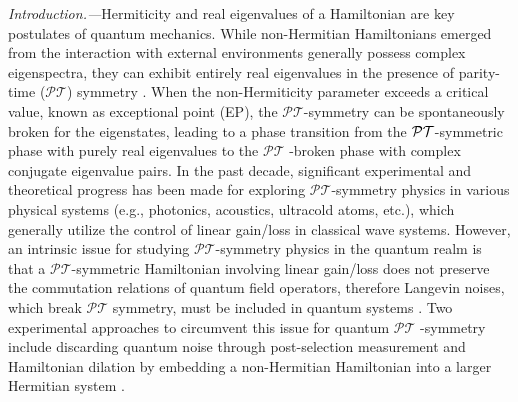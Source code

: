 \documentclass[twocolumn,prl,floatfix,citeautoscript,nofootinbib,superscriptaddress]{revtex4}
\begin{document}
\emph{{\color{blue}Introduction}.---}Hermiticity and real eigenvalues of a
Hamiltonian are key postulates of quantum mechanics. While non-Hermitian
Hamiltonians emerged from the interaction with external environments
generally possess complex eigenspectra, they can exhibit entirely real
eigenvalues in the presence of parity-time ($\mathcal{PT}$) symmetry \cite%
{PhysRevLett.80.5243,Rep.70.947,nphys4323,s41563-019-0304-9,RevModPhys.88.035002,LFeng,science.aar7709}%
. When the non-Hermiticity parameter exceeds a critical value, known as
exceptional point (EP), the $\mathcal{PT}$-symmetry can be spontaneously
broken for the eigenstates, leading to a phase transition from the $\mathcal{%
PT}$-symmetric phase with purely real eigenvalues to the $\mathcal{PT}$%
-broken phase with complex conjugate eigenvalue pairs. In the past decade,
significant experimental and theoretical progress \cite%
{OL.32.002632,PhysRevLett.103.093902,nphys1515,nphys2927,PhysRevLett.110.083604,PhysRevLett.117.123601, PhysRevA.84.040101, PhysRevX.4.031042,ncomms6905, science.1258479,science.1258480, PhysRevLett.112.203901,PhysRevLett.117.110802}
has been made for exploring $\mathcal{PT}$-symmetry physics in various
physical systems (e.g., photonics, acoustics, ultracold atoms, etc.), which
generally utilize the control of linear gain/loss in classical wave systems.
However, an intrinsic issue for studying $\mathcal{PT}$-symmetry physics in
the quantum realm \cite%
{ncomms14154,ncomms4320,PhysRevLett.124.020501,PhysRevLett.123.180501,
GCGuo,Murch,JFDu} is that a $\mathcal{PT}$-symmetric Hamiltonian involving
linear gain/loss does not preserve the commutation relations of quantum
field operators, therefore Langevin noises, which break $\mathcal{PT}$
symmetry, must be included in quantum systems \cite{EPLScheel2018}. Two
experimental approaches to circumvent this issue for quantum $\mathcal{PT}$%
-symmetry include discarding quantum noise through post-selection
measurement \cite{Murch} and Hamiltonian dilation by embedding a
non-Hermitian Hamiltonian into a larger Hermitian system \cite{JFDu}.
\end{document}
